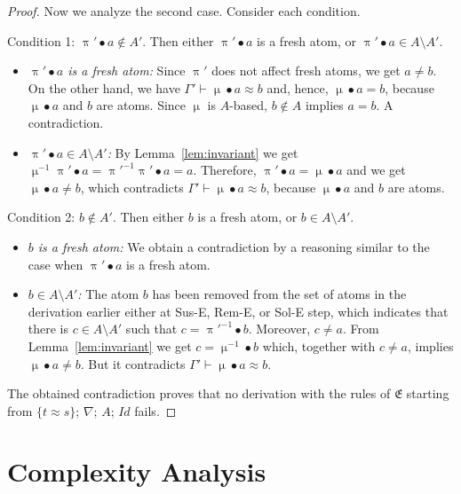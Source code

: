\documentclass{llncs}
\newcommand{\idp}{\mathit{Id}}
\newcommand{\perm}{\approx}
\newcommand{\permef}{\bullet}
\newcommand\ppi{\uppi}
\newcommand\pmu{\upmu}
\newcommand{\msys}{\mathfrak{E}}
\newcommand{\Atoms}{A}
\newcommand{\nablai}{{\nabla}}
\newcommand{\nablag}{\Gamma}
\begin{document}
\begin{proof}
   Now we analyze the second case. Consider each condition.

   Condition 1: $\ppi'\permef a\notin A'$. Then either
   $\ppi'\permef a$ is a fresh atom, or $\ppi'\permef a
   \in A\setminus A'$.
\begin{itemize}
  \item \emph{$\ppi'\permef a$ is a fresh atom:} Since $\ppi'$ does
    not affect fresh atoms, we get $a \neq b$. On the other hand, we
    have $\nablag' \vdash \pmu \permef a \approx b$ and, hence, $\pmu
    \permef a = b$, because $\pmu \permef a$ and $b$ are atoms.  Since
    $\pmu$ is $A$-based, $b\notin A$ implies $a=b$. A contradiction.
  \item \emph{$\ppi'\permef a \in A\setminus A'$:} By
    Lemma~\ref{lem:invariant} we get $\pmu^{-1}\ppi' \permef a =
    \ppi'^{-1}\ppi' \permef a = a$. Therefore, $\ppi'\permef a
    =\pmu\permef a$ and we get $\pmu \permef a \neq b$, which
    contradicts $\nablag' \vdash \pmu \permef a \approx b$, because
    $\pmu\permef a$ and $b$ are atoms.
\end{itemize}

Condition 2: $b \notin A'$. Then either $b$ is a fresh atom, or $b \in A\setminus A'$.
\begin{itemize}
  \item \emph{$b$ is a fresh atom:} We obtain a contradiction by a
    reasoning similar to the case when $\ppi'\permef a$ is a
    fresh atom.
  \item \emph{$b \in A\setminus A'$:} The atom $b$ has been removed
    from the set of atoms in the derivation earlier either at {\sf
      Sus-E}, {\sf Rem-E}, or {\sf Sol-E} step, which indicates that
    there is $c\in A\setminus A'$ such that $c=\ppi'^{-1}\permef
    b$. Moreover, $c\neq a$. From Lemma~\ref{lem:invariant} we get
    $c=\pmu^{-1} \permef b$ which, together with $c\neq a$, implies
    $\pmu \permef a \neq b$. But it contradicts $\nablag' \vdash
    \pmu\permef a \approx b$.
\end{itemize}

   The obtained contradiction proves that no derivation with the rules
   of $\msys$ starting from $ \{t\perm s\}
   ;\,\allowbreak \nablai ;\,\allowbreak \Atoms ;\,\allowbreak \idp$
   fails.
\end{proof}


\section{Complexity Analysis}
\end{document}
